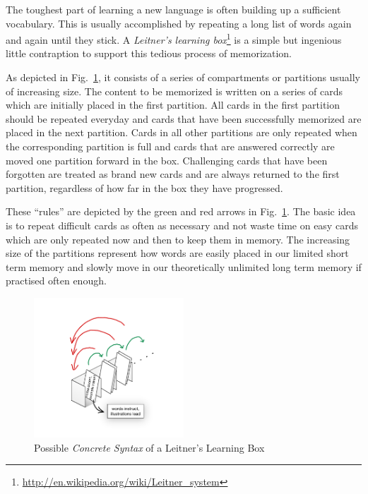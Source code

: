 \genHeader


The toughest part of learning a new language  is often building up a sufficient vocabulary. This is usually accomplished by repeating a long list of words again
and again until they stick. A \emph{Leitner's learning box}\footnote{\url{http://en.wikipedia.org/wiki/Leitner_system}} is a simple but ingenious little
contraption to support this tedious process of memorization.

As depicted in Fig.~\ref{fig:membox_illustration}, it consists of a series of compartments or partitions usually of increasing size. The content to be memorized
is written on a series of cards  which are initially placed in the first partition. All cards in the first  partition should be repeated everyday and cards that
have been successfully memorized are placed in the next partition. Cards in all other partitions are only repeated when the corresponding partition is full and
cards that are answered correctly are moved one partition forward in the box. Challenging cards that have been forgotten are treated as brand new cards and
are always returned to the first partition, regardless of how far in the box they have progressed.

These ``rules'' are depicted by the green and red arrows in Fig.~\ref{fig:membox_illustration}. The basic idea is to repeat difficult cards as often as
necessary and not waste time on easy cards which are only repeated now and then to keep them in memory. The increasing size of the partitions represent how
words are easily placed in our limited short term memory and slowly move in our theoretically unlimited long term memory if practised often enough.

 \begin{figure}[htp]
 \begin{center}
   \includegraphics[width=0.5\textwidth]{membox_illustration}
   \caption[]{Possible \emph{Concrete Syntax} of a Leitner's Learning Box}
   \label{fig:membox_illustration}
 \end{center}
 \end{figure}
 \FloatBarrier

